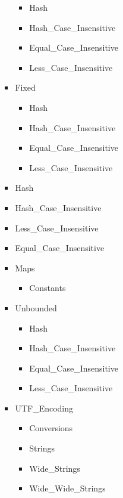 \documentclass[english]{article}
\begin{document}
\begin{scriptsize}
\begin{multicols*}{5}
\begin{itemize}[leftmargin=0mm]
\begin{itemize}[leftmargin=5mm]
\begin{itemize}[leftmargin=5mm]
\begin{itemize}[leftmargin=5mm]
                  \item[] Hash
                  \item[] Hash\_Case\_Insensitive
                  \item[] Equal\_Case\_Insensitive
                  \item[] Less\_Case\_Insensitive
               \end{itemize}
            \item[] Fixed
               \begin{itemize}[leftmargin=5mm]
                  \item[] Hash
                  \item[] Hash\_Case\_Insensitive
                  \item[] Equal\_Case\_Insensitive
                  \item[] Less\_Case\_Insensitive
               \end{itemize}
            \item[] Hash
            \item[] Hash\_Case\_Insensitive
            \item[] Less\_Case\_Insensitive
            \item[] Equal\_Case\_Insensitive
            \item[] Maps
               \begin{itemize}[leftmargin=5mm]
                  \item[] Constants
               \end{itemize}
            \item[] Unbounded
               \begin{itemize}[leftmargin=5mm]
                  \item[] Hash
                  \item[] Hash\_Case\_Insensitive
                  \item[] Equal\_Case\_Insensitive
                  \item[] Less\_Case\_Insensitive
               \end{itemize}
            \item[] UTF\_Encoding
               \begin{itemize}[leftmargin=5mm]
                  \item[] Conversions
                  \item[] Strings
                  \item[] Wide\_Strings
                  \item[] Wide\_Wide\_Strings

\end{itemize}
\end{itemize}
\end{itemize}
\end{itemize}
\end{multicols*}
\end{scriptsize}
\end{document}
